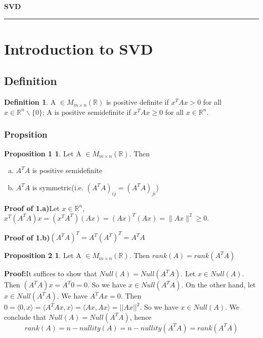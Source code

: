 \documentclass[12pt]{article}
\theoremstyle{definition}
\newtheorem{df1}{Definition}
\newtheorem*{prop1}{Proposition 1}
\newtheorem*{prop2}{Proposition 2}
\begin{document}
\begin{titlepage}
\begin{center}
\vspace*{5cm}
    \textbf{\Huge SVD}
\end{center}
\end{titlepage}

\hrule

\section{Introduction to SVD}
\subsection{Definition}
\begin{df1}
    A $\in M_{m\times n}(\mathbb{R})$ is positive definite if 
    $x^TAx>0$ for all $x \in \mathbb{R}^n\backslash\{0\}$; 
    A is positive semidefinite if 
    $x^TAx \geq 0$ for all $x \in \mathbb{R}^n$.
\end{df1}

\subsubsection{Propsition}
\begin{prop1}
Let A $\in M_{m\times n}(\mathbb{R})$. Then
    \begin{enumerate}[a).]
        \item $A^TA$ is positive semidefinite
        \item $A^TA$ is symmetric\quad (i.e.\; $(A^TA)_{ij}=(A^TA)_{ji}$)
    \end{enumerate}
\end{prop1}

\textbf{Proof of 1.a)}\quad Let $x \in \mathbb{R}^n$, 
$x^T(A^TA)x=(x^TA^T)(Ax)=(Ax)^T(Ax)=\|{Ax}\|^2 \geq 0.$

\textbf{Proof of 1.b)}\quad $(A^TA)^T=A^T(A^T)^T=A^TA$

\begin{prop2}
    Let A $\in M_{m\times n}(\mathbb{R})$. Then
    \(rank(A)=rank(A^TA)\)
\end{prop2}

\textbf{Proof:}\quad It suffices to show that $Null(A)=Null(A^TA)$. Let $x\in Null(A)$. Then $(A^TA)x=A^T0=0$. So we have $x\in Null(A^TA)$. On the other hand, let $x\in Null(A^TA)$. We have $A^TAx=0$. Then $0=\langle 0,x\rangle=\langle A^TAx,x \rangle=\langle Ax,Ax \rangle=||Ax||^2$. So we have $x\in Null(A)$. We conclude that $Null(A)=Null(A^TA)$, hence 
\[rank(A)=n-nullity(A)=n-nullity(A^TA)=rank(A^TA)\]
\end{document}
